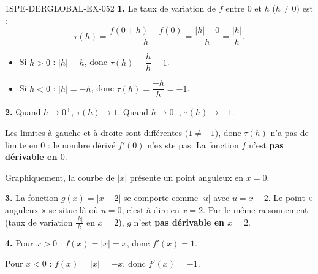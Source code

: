 \begin{corrige}{1SPE-DERGLOBAL-EX-052}
\textbf{1.} Le taux de variation de $f$ entre $0$ et $h$ ($h
\neq 0$) est :
\[
\tau(h) = \frac{f(0+h) - f(0)}{h} = \frac{|h| - 0}{h} = \frac{|h|}{h}.
\]

\begin{itemize}
  \item Si $h > 0$ : $|h| = h$, donc $\tau(h) = \dfrac{h}{h} = 1$.
  \item Si $h < 0$ : $|h| = -h$, donc $\tau(h) = \dfrac{-h}{h} = -1$.
\end{itemize}

\textbf{2.} Quand $h \to 0^+$, $\tau(h) \to 1$. Quand $h \to 0^-$, $\tau(h) \to -1$.

Les limites à gauche et à droite sont différentes ($1
\neq -1$), donc $\tau(h)$ n'a pas de limite en $0$ : le nombre dérivé $f'(0)$ n'existe pas. La fonction $f$ n'est \textbf{pas dérivable en $0$}.

Graphiquement, la courbe de $|x|$ présente un point anguleux en $x = 0$.

\textbf{3.} La fonction $g(x) = |x - 2|$ se comporte comme $|u|$ avec $u = x - 2$. Le point « anguleux » se situe là où $u = 0$, c'est-à-dire en $x = 2$. Par le même raisonnement (taux de variation $\frac{|h|}{h}$ en $x = 2$), $g$ n'est \textbf{pas dérivable en $x = 2$}.

\textbf{4.} Pour $x > 0$ : $f(x) = |x| = x$, donc $f'(x) = 1$.

Pour $x < 0$ : $f(x) = |x| = -x$, donc $f'(x) = -1$.
\end{corrige}

